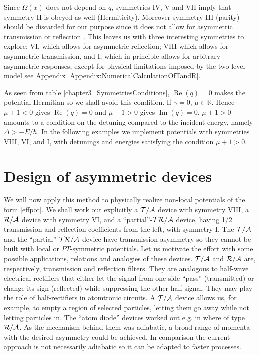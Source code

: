 Since $\Omega(x)$ does not depend on $q$, symmetries IV, V and VII imply that symmetry II is obeyed as well (Hermiticity).
Moreover symmetry III (parity) should be discarded for our purpose since it does not allow for asymmetric transmission or reflection
\cite{Ruschhaupt2017}.
This leaves us with three interesting symmetries to explore:
VI, which allows for  asymmetric reflection; VIII which allows for asymmetric transmission, and  I,
which in principle allows for arbitrary asymmetric responses, except for physical limitations imposed by
the two-level model see Appendix \ref{Appendix:NumericalCalculationOfTandR}.


%
%
As seen from  table \ref{chapter3_SymmetriesConditions}, $\operatorname{Re}(q)=0$ makes the potential Hermitian so we shall avoid this condition.
If $\gamma=0$,   $\mu \in \mathbb{R}$. Hence $\mu+1<0$ gives $\operatorname{Re}(q)=0$ and $\mu+1>0$ gives
$\operatorname{Im}(q)=0$. $\mu+1>0$ amounts to a condition on the detuning compared to the incident energy, namely $\Delta>-E/\hbar$.
In the following examples we implement potentials with symmetries VIII, VI, and I, with detunings and energies satisfying the condition $\mu+1>0$.
%
%
%

%
%
%
\section{Design of asymmetric devices\label{exa}}
%
%
We will now apply this method to physically realize non-local potentials of the form \eqref{effpot}.
%
We  shall work out  explicitly a ${\cal T/A}$ device with symmetry  VIII, a ${\cal R/A}$ device with symmetry  VI, and a ``partial''-${\cal TR/A}$ device,  having 1/2 transmission and reflection coefficients from the left, with symmetry I. The  ${\cal T/A}$ and the ``partial''-${\cal TR/A}$ device have transmission asymmetry so they cannot be built with local or $PT$-symmetric  potentials.
Let us  motivate the effort with some possible applications, relations  and analogies of these devices.
${\cal T/A}$ and ${\cal R/A}$ are, respectively, transmission and reflection filters. They are analogous to
half-wave electrical rectifiers that either let the signal from one side ``pass'' (transmitted) or change its sign (reflected)
while suppressing the other half signal.  They may play the role of half-rectifiers in atomtronic circuits.
A ${\cal T/A}$ device allows us, for example, to empty a region of selected particles, letting them go away while not letting particles in.
The ``atom diode'' devices worked out e.g. in \cite{Ruschhaupt2004,Ruschhaupt2006a,Ruschhaupt2006,Ruschhaupt2007}
where of type ${\cal R/A}$. As the mechanism behind them was adiabatic, a broad range of momenta with the desired asymmetry
could be achieved. In comparison the current approach is not necessarily adiabatic so it can be adapted to faster processes.

